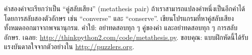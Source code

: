 \begin{exercise}


คำสองคำจะเรียกว่าเป็น ``คู่สลับเสียง'' (metathesis pair)
ถ้าเราสามารถแปลงคำหนึ่งเป็นอีกคำได้โดยการสลับสองตัวอักษร
เช่น ``converse'' และ ``conserve''.
เขียนโปรแกรมที่หาคู่สลับเสียงทั้งหมดออกมาจากพจนานุกรม.
คำใบ้: อย่าทดสอบทุก ๆ คู่ของคำ
และอย่าทดสอบทุก ๆ การสลับอักษร.
เฉลย: \url{http://thinkpython2.com/code/metathesis.py}.  
%
ขอบคุณ: 
แบบฝึกหัดนี้ได้รับแรงบันดาลใจจากตัวอย่างใน \url{http://puzzlers.org}.

\end{exercise}
\vspace{0.5cm}


